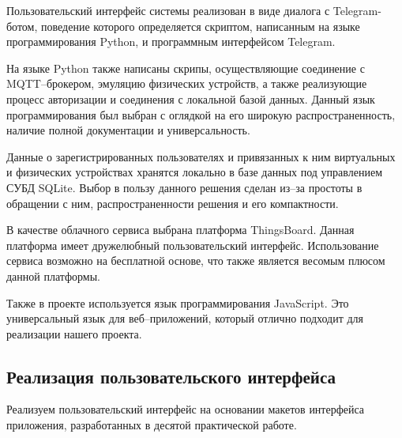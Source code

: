 \documentclass[a4paper,14pt]{extarticle}
\begin{document}
Пользовательский интерфейс системы реализован в виде диалога с Telegram-ботом, поведение которого определяется скриптом, написанным на языке программирования Python, и программным интерфейсом Telegram. 

На языке Python также написаны скрипы, осуществляющие соединение с \mbox{MQTT--брокером}, эмуляцию физических устройств, а также реализующие процесс авторизации и соединения с локальной базой данных. Данный язык программирования был выбран с оглядкой на его широкую распространенность, наличие полной документации и универсальность.

Данные о зарегистрированных пользователях и привязанных к ним виртуальных и физических устройствах хранятся локально в базе данных под управлением СУБД SQLite. 
Выбор в пользу данного решения сделан \mbox{из--за} простоты в обращении с ним, распространенности решения и его компактности.

В качестве облачного сервиса выбрана платформа ThingsBoard. 
Данная платформа имеет дружелюбный пользовательский интерфейс. Использование сервиса возможно на бесплатной основе, что также является весомым плюсом данной платформы.

Также в проекте используется язык программирования JavaScript. 
Это универсальный язык для веб--приложений, который отлично подходит для реализации нашего проекта.

\subsection{Реализация пользовательского интерфейса}

Реализуем пользовательский интерфейс на основании макетов интерфейса приложения, разработанных в десятой практической работе. 
\end{document}
